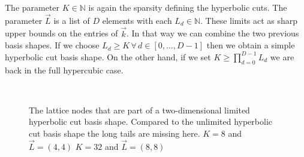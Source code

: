 The parameter $K \in \mathbb{N}$ is again the sparsity defining the hyperbolic
cuts. The parameter $\vec{L}$ is a list of $D$ elements with each $L_d \in \mathbb{N}$.
These limits act as sharp upper bounds on the entries of $\vec{k}$. In that way
we can combine the two previous basis shapes. If we choose $L_d \geq K \,\forall\,
d \in [0,\ldots, D-1]$ then we obtain a simple hyperbolic cut basis shape. On the
other hand, if we set $K \geq \prod_{d=0}^{D-1} L_d$ we are back in the full
hypercubic case.

\begin{figure}
  \centering
   \\
  \caption[Hyperbolic cut basis shape with limits in two dimensions]{
    The lattice nodes that are part of a two-dimensional limited hyperbolic cut
    basis shape. Compared to the unlimited hyperbolic cut basis shape
    the long tails are missing here.
     $K = 8$ and $\vec{L} = (4,4)$
     $K = 32$ and $\vec{L} = (8,8)$
    \label{fig:hyperbolic_limited_2D}
  }
\end{figure}

